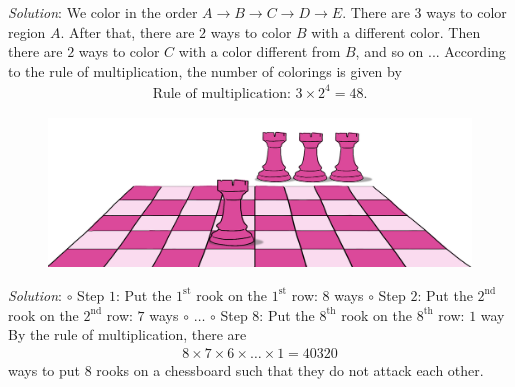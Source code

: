 \begin{multicols}{2}
\begin{center}
	\end{center}
	\textit{Solution}: We color in the order $A \to B \to C \to D \to E$. There are $3$ ways to color region $A$. After that, there are $2$ ways to color $B$ with a different color. Then there are $2$ ways to color $C$ with a color different from $B$, and so on ...
	\vskip 0.1cm   
	According to the rule of multiplication, the number of colorings is given by
	\begin{align*}
		\text{Rule of multiplication: } 3 \times 2^4= 48.
	\end{align*}
	\vskip 0.1cm
	\begin{figure}[H]
		\centering
		\captionsetup{labelformat= empty, justification=centering}
		\includegraphics[width=1\linewidth]{xe}
		\vspace*{-10pt}
	\end{figure}
	\textit{Solution}:
	\vskip 0.1cm 
	$\circ$ Step $1$: Put the $1^{\text{st}}$ rook on the $1^{\text{st}}$ row: $8$ ways
	\vskip 0.1cm
	$\circ$ Step $2$: Put the $2^{\text{nd}}$ rook on the $2^{\text{nd}}$ row: $7$ ways
	\vskip 0.1cm
	$\circ$ $\ldots$
	\vskip 0.1cm
	$\circ$ Step $8$: Put the $8^{\text{th}}$ rook on the $8^{\text{th}}$ row: $1$ way
	\vskip 0.1cm
	By the rule of multiplication, there are 
	\begin{align*}
		8\times7\times6\times\ldots\times1=40320
	\end{align*}
	ways to put $8$ rooks on a chessboard such that they do not attack each other.
	\vskip 0.1cm

\end{multicols}
